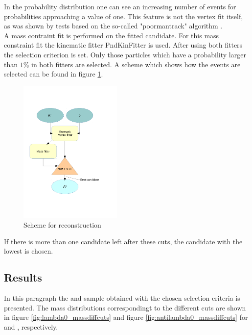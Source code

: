 		In the probability distribution one can see an increasing number of events for probabilities approaching a value of one.
		This feature is not the vertex fit itself, as was shown by tests based on the so-called "poormantrack" algorithm \cite{RalfKliemt}.
		\vspace{11pt}\\
		A mass contraint fit is performed on the fitted candidate.
		For this mass constraint fit the kinematic fitter PndKinFitter is used.
		After using both fitters the selection criterion is set. 
		Only those particles which have a probability larger than $1\%$ in both fitters are selected.
		A scheme which shows how the events are selected can be found in figure \ref{fig:lambda_scheme}. 
		
		\begin{figure}
			\centering
				\includegraphics[width=0.45\textwidth]{./plots/combineLambda0.pdf}
			\caption{\propose Scheme for \lam reconstruction}
			\label{fig:lambda_scheme}
		\end{figure}
		
		If there is more than one candidate left after these cuts, the candidate with the lowest \chisq is chosen.
		
		
	\subsection*{Results}
		In this paragraph the \lam and \alam sample obtained with the chosen selection criteria is presented.
		The mass distributions correspondingt to the different cuts are shown in figure \ref{fig:lambda0_massdiffcuts} 
		and figure \ref{fig:antilambda0_massdiffcuts} for \lam and \alam, respectively.
	
